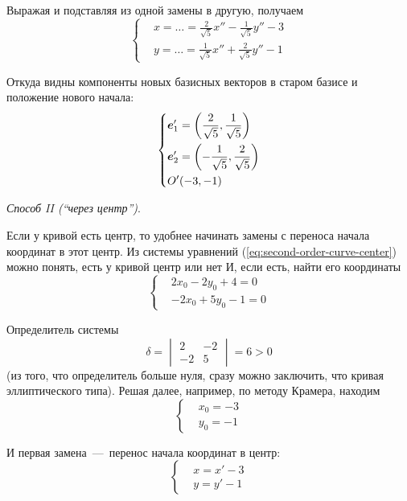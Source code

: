 \documentclass[a4paper,12pt]{article}
\begin{document}
\begin{solution}
    Выражая и подставляя из одной замены в другую, получаем
    \[
      \left\{
        \begin{aligned}
          &x = \ldots = \frac{2}{\sqrt{5}}x'' - \frac{1}{\sqrt{5}}y'' - 3\\
          &y = \ldots = \frac{1}{\sqrt{5}}x'' + \frac{2}{\sqrt{5}}y'' - 1
        \end{aligned}
      \right.
    \]
    
    Откуда видны компоненты новых базисных векторов в старом базисе и положение нового начала:
    \[
      \left\{
        \begin{aligned}
          &\boldsymbol e_1' = \left(\frac{2}{\sqrt{5}}, \frac{1}{\sqrt{5}}\right)\\
          &\boldsymbol e_2' = \left(-\frac{1}{\sqrt{5}}, \frac{2}{\sqrt{5}}\right)\\
          &O'(-3, -1)
        \end{aligned}
      \right.
    \]
    
    
    \emph{Способ II (``через центр'')}.
    
    Если у кривой есть центр, то удобнее начинать замены с переноса начала координат в этот центр.
    Из системы уравнений (\ref{eq:second-order-curve-center}) можно понять, есть у кривой центр или нет
    И, если есть, найти его координаты
    \[
      \left\{
        \begin{aligned}
          &2x_0 - 2y_0 + 4 = 0\\
          &-2x_0 + 5y_0 - 1 = 0
        \end{aligned}
      \right.
    \]
    
    Определитель системы
    \[
      \delta = \begin{vmatrix}2 & -2 \\ -2 & 5\end{vmatrix} = 6 > 0
    \]
    (из того, что определитель больше нуля, сразу можно заключить, что кривая эллиптического типа).
    Решая далее, например, по методу Крамера, находим
    \[
      \left\{
        \begin{aligned}
          &x_0 = -3\\
          &y_0 = -1
        \end{aligned}
      \right.
    \]
    
    И первая замена~---~перенос начала координат в центр:
    \[
      \left\{
        \begin{aligned}
          &x = x' - 3\\
          &y = y' - 1
        \end{aligned}
      \right.
    \]
    

\end{solution}
\end{document}
